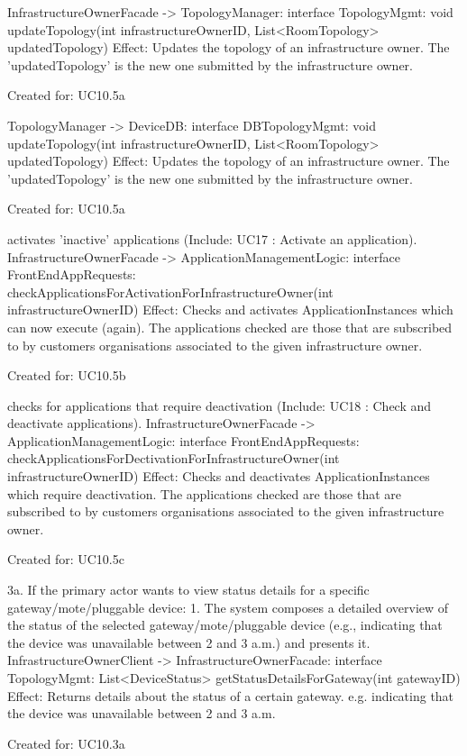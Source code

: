 {{{{{{{            InfrastructureOwnerFacade -> TopologyManager: interface TopologyMgmt: void updateTopology(int infrastructureOwnerID, List<RoomTopology> updatedTopology)
               Effect: Updates the topology of an infrastructure owner. The 'updatedTopology' is the new one submitted by the infrastructure owner.
               \item Created for: UC10.5a

            TopologyManager -> DeviceDB: interface DBTopologyMgmt: void updateTopology(int infrastructureOwnerID, List<RoomTopology> updatedTopology)
               Effect: Updates the topology of an infrastructure owner. The 'updatedTopology' is the new one submitted by the infrastructure owner.
               \item Created for: UC10.5a

           { activates 'inactive' applications (Include: UC17 : Activate an application).
            InfrastructureOwnerFacade -> ApplicationManagementLogic: interface FrontEndAppRequests: checkApplicationsForActivationForInfrastructureOwner(int infrastructureOwnerID)
                Effect: Checks and activates ApplicationInstances which can now execute (again). The applications checked are those that are subscribed to by customers organisations associated to the given infrastructure owner.
                \item Created for: UC10.5b

           { checks for applications that require deactivation (Include: UC18 : Check and deactivate applications).
            InfrastructureOwnerFacade -> ApplicationManagementLogic: interface FrontEndAppRequests: checkApplicationsForDectivationForInfrastructureOwner(int infrastructureOwnerID)
                Effect: Checks and deactivates ApplicationInstances which require deactivation. The applications checked are those that are subscribed to by customers organisations associated to the given infrastructure owner.
                \item Created for: UC10.5c

        3a. If the primary actor wants to view status details for a specific gateway/mote/pluggable device:
            1. The system composes a detailed overview of the status of the selected gateway/mote/pluggable device (e.g., indicating that the device was unavailable between 2 and 3 a.m.) and presents it.
                InfrastructureOwnerClient -> InfrastructureOwnerFacade: interface TopologyMgmt: List<DeviceStatus> getStatusDetailsForGateway(int gatewayID)
                    Effect: Returns details about the status of a certain gateway. e.g. indicating that the device was unavailable between 2 and 3 a.m.
                    \item Created for: UC10.3a

}}}}}}}}}
